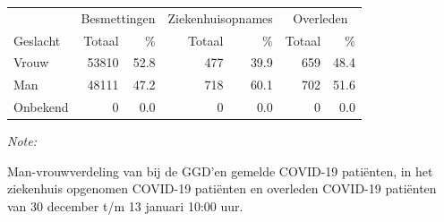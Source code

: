 \documentclass[
  english,
  man,floatsintext]{apa6}
\begin{document}
\begin{table}[H]
\centering\begingroup\fontsize{11}{13}\selectfont

\begin{threeparttable}
\begin{tabular}{lrrrrrr}
\toprule
\multicolumn{1}{c}{ } & \multicolumn{2}{c}{Besmettingen} & \multicolumn{2}{c}{Ziekenhuisopnames} & \multicolumn{2}{c}{Overleden} \\
\cmidrule(l{3pt}r{3pt}){2-3} \cmidrule(l{3pt}r{3pt}){4-5} \cmidrule(l{3pt}r{3pt}){6-7}
Geslacht & Totaal & \% & Totaal & \% & Totaal & \%\\
\midrule
Vrouw & 53810 & 52.8 & 477 & 39.9 & 659 & 48.4\\
Man & 48111 & 47.2 & 718 & 60.1 & 702 & 51.6\\
Onbekend & 0 & 0.0 & 0 & 0.0 & 0 & 0.0\\
\bottomrule
\end{tabular}
\begin{tablenotes}
\item \textit{Note: } 
\item Man-vrouwverdeling van bij de GGD’en gemelde COVID-19 patiënten, in het ziekenhuis opgenomen COVID-19 patiënten en overleden COVID-19 patiënten van 30 december t/m 13 januari 10:00 uur.
\end{tablenotes}
\end{threeparttable}
\endgroup{}
\end{table}
\newpage
\end{document}
